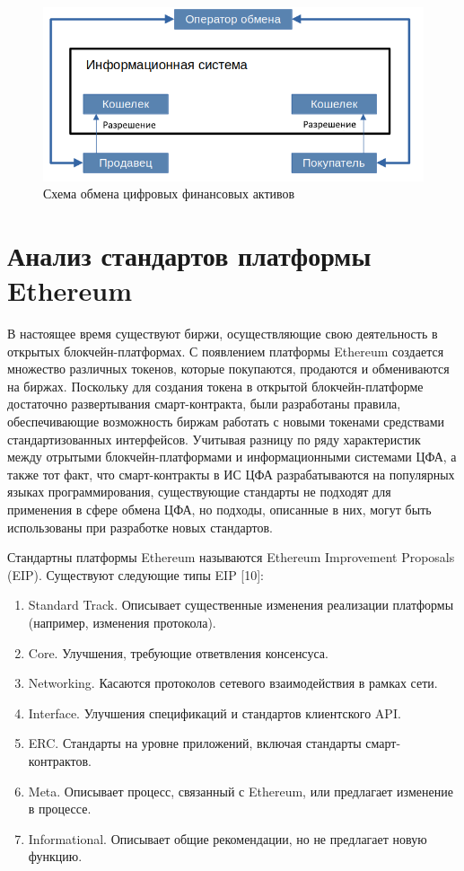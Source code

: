 \documentclass[a4paper, 10pt]{article}
\begin{document}
	\begin{figure}
		\includegraphics[width=16cm]{schema}
		\centering
		\caption{Схема обмена цифровых финансовых активов}
		\label{figure:schema}
	\end{figure}
	
	\section*{Анализ стандартов платформы Ethereum}
	
	В настоящее время существуют биржи, осуществляющие свою деятельность в открытых блокчейн-платформах. С появлением платформы Ethereum создается множество различных токенов, которые покупаются, продаются и обмениваются на биржах. Поскольку для создания токена в открытой блокчейн-платформе достаточно развертывания смарт-контракта, были разработаны правила, обеспечивающие возможность биржам работать с новыми токенами средствами стандартизованных интерфейсов. Учитывая разницу по ряду характеристик между отрытыми блокчейн-платформами и информационными системами ЦФА, а также тот факт, что смарт-контракты в ИС ЦФА разрабатываются на популярных языках программирования, существующие стандарты не подходят для применения в сфере обмена ЦФА, но подходы, описанные в них, могут быть использованы при разработке новых стандартов. 
	
	Стандартны платформы Ethereum называются Ethereum Improvement Proposals (EIP). Существуют следующие типы EIP [10]:
	
	\begin{enumerate}
		\itemsep0em
		\item Standard Track. Описывает существенные изменения реализации платформы (например, изменения протокола).
		\item Core. Улучшения, требующие ответвления консенсуса.
		\item Networking. Касаются протоколов сетевого взаимодействия в рамках сети.
		\item Interface. Улучшения спецификаций и стандартов клиентского API.
		\item ERC. Стандарты на уровне приложений, включая стандарты смарт-контрактов.
		\item Meta. Описывает процесс, связанный с Ethereum, или предлагает изменение в процессе.
		\item Informational. Описывает общие рекомендации, но не предлагает новую функцию.
	\end{enumerate}
	
\end{document}
